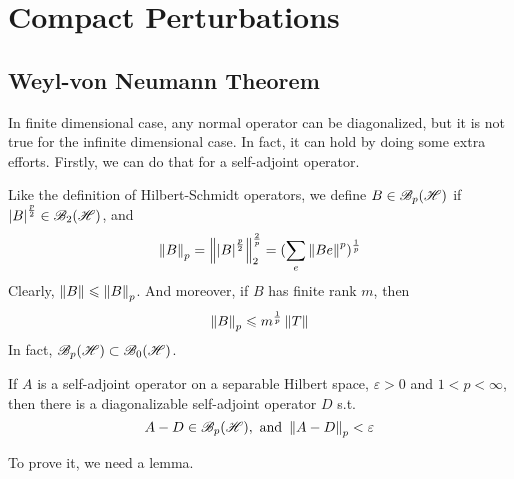\section{Compact Perturbations}

\subsection{Weyl-von Neumann Theorem}

In finite dimensional case, any normal operator can be diagonalized, but it is not true for the infinite dimensional case. In fact, it can hold by doing some extra efforts. Firstly, we can do that for a self-adjoint operator. 

Like the definition of Hilbert-Schmidt operators, we define $B \in \mathscr{B}_p(\mathscr{H})$ if $\left\lvert B\right\lvert^{\frac{p}{2}} \in \mathscr{B}_{2}\mathscr{(H)}$, and 
\begin{equation*}
	\left\lVert B\right\lVert_p = \left\lVert\left\lvert B\right\lvert^{\frac{p}{2}}\right\lVert_2^{\frac{2}{p}} = (\sum_e \left\lVert Be\right\lVert^p)^{\frac{1}{p}}
\end{equation*}
Clearly, $\left\lVert B\right\lVert \leqslant \left\lVert B\right\lVert_p$. And moreover, if $B$ has finite rank $m$, then
\begin{equation*}
	\left\lVert B\right\lVert_p \leqslant m^{\frac{1}{p}} \left\lVert T\right\lVert
\end{equation*}
In fact, $\mathscr{B}_p(\mathscr{H}) \subset \mathscr{B}_{0}\mathscr{(H)}$.

\begin{thm}
	If $A$ is a self-adjoint operator on a separable Hilbert space, $\varepsilon > 0$ and $1 < p < \infty$, then there is a diagonalizable self-adjoint operator $D$ s.t. 
	\begin{equation*}
		A-D \in \mathscr{B}_p(\mathscr{H}), \text{ and } \left\lVert A-D\right\lVert_p < \varepsilon
	\end{equation*}
\end{thm}

To prove it, we need a lemma.

